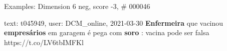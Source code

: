 \begin{frame}{Examples: Dimension 6 neg, score -3, \# 000046}
\footnotesize
\begin{alertblock}{text: t045949, user: DCM\_online, 2021-03-30}
\textbf{Enfermeira} que vacinou \textbf{empresários} em garagem é pega com 
\textbf{soro} : vacina pode ser falsa https://t.co/LV6tbIMFKl 
\end{alertblock}
\end{frame}
